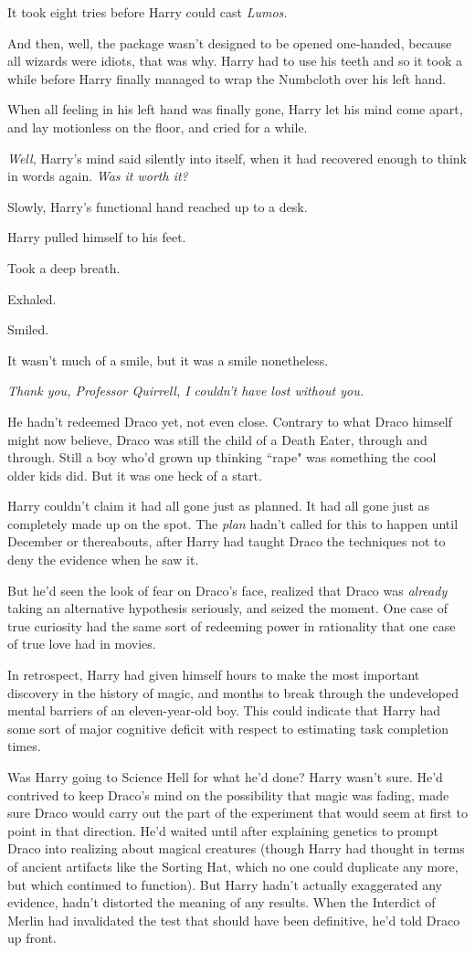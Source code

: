 It took eight tries before Harry could cast \emph{Lumos.}

And then, well, the package wasn't designed to be opened one-handed, because all wizards were idiots, that was why. Harry had to use his teeth and so it took a while before Harry finally managed to wrap the Numbcloth over his left hand.

When all feeling in his left hand was finally gone, Harry let his mind come apart, and lay motionless on the floor, and cried for a while.

\emph{Well,} Harry's mind said silently into itself, when it had recovered enough to think in words again. \emph{Was it worth it?}

Slowly, Harry's functional hand reached up to a desk.

Harry pulled himself to his feet.

Took a deep breath.

Exhaled.

Smiled.

It wasn't much of a smile, but it was a smile nonetheless.

\emph{Thank you, Professor Quirrell, I couldn't have lost without you.}

He hadn't redeemed Draco yet, not even close. Contrary to what Draco himself might now believe, Draco was still the child of a Death Eater, through and through. Still a boy who'd grown up thinking ``rape" was something the cool older kids did. But it was one heck of a start.

Harry couldn't claim it had all gone just as planned. It had all gone just as completely made up on the spot. The \emph{plan} hadn't called for this to happen until December or thereabouts, after Harry had taught Draco the techniques not to deny the evidence when he saw it.

But he'd seen the look of fear on Draco's face, realized that Draco was \emph{already} taking an alternative hypothesis seriously, and seized the moment. One case of true curiosity had the same sort of redeeming power in rationality that one case of true love had in movies.

In retrospect, Harry had given himself hours to make the most important discovery in the history of magic, and months to break through the undeveloped mental barriers of an eleven-year-old boy. This could indicate that Harry had some sort of major cognitive deficit with respect to estimating task completion times.

Was Harry going to Science Hell for what he'd done? Harry wasn't sure. He'd contrived to keep Draco's mind on the possibility that magic was fading, made sure Draco would carry out the part of the experiment that would seem at first to point in that direction. He'd waited until after explaining genetics to prompt Draco into realizing about magical creatures (though Harry had thought in terms of ancient artifacts like the Sorting Hat, which no one could duplicate any more, but which continued to function). But Harry hadn't actually exaggerated any evidence, hadn't distorted the meaning of any results. When the Interdict of Merlin had invalidated the test that should have been definitive, he'd told Draco up front.

